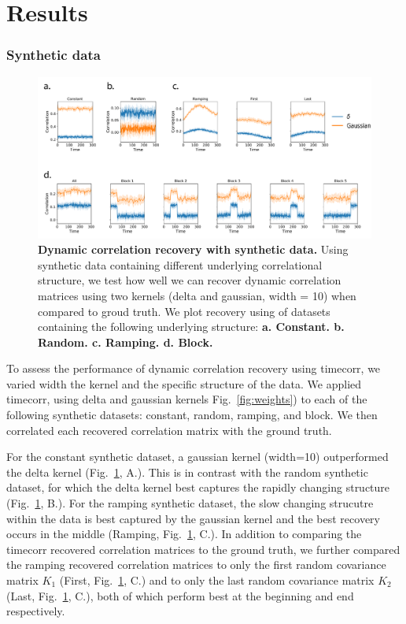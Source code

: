 \documentclass[english]{article}
\begin{document}
\section*{Results}
\subsubsection*{Synthetic data}


\begin{figure}
  \centering
  \includegraphics[width=\textwidth]{figs/synthetic_data.pdf}
  \caption{\textbf{Dynamic correlation recovery with synthetic data. } Using synthetic data containing different
    underlying correlational structure,
   we test how well we can recover dynamic correlation matrices using two kernels (delta and gaussian,
    width = 10) when compared to groud truth.  We plot recovery using of datasets containing the
    following underlying structure:
    \textbf{a. Constant. b. Random. c. Ramping.  d. Block.}}
  \label{fig:synthetic_data}
\end{figure}

To assess the performance of dynamic correlation recovery using
timecorr, we varied width the kernel and the specific structure of the
data. We applied timecorr, using delta and gaussian kernels
Fig.~\ref{fig:weights}) to each of the following  
synthetic datasets: constant, random, ramping, and block.  We then correlated each recovered
correlation matrix with the ground truth. 

For the constant synthetic dataset, a gaussian kernel (width=10)
outperformed the delta kernel (Fig.~\ref{fig:synthetic_data},  A.).  This is in contrast with the random
synthetic dataset, for which the delta kernel best captures the
rapidly changing structure (Fig.~\ref{fig:synthetic_data},  B.). For
the ramping synthetic dataset, the slow changing strucutre within the
data is best
captured by the gaussian kernel and the best recovery occurs in the
middle (Ramping, Fig.~\ref{fig:synthetic_data},
C.). In addition to comparing the timecorr recovered correlation
matrices to the ground truth, we
further compared the ramping recovered correlation matrices to only the first random covariance matrix $K_{1}$
(First, Fig.~\ref{fig:synthetic_data},  C.) and to only the last
random covariance matrix $K_{2}$ (Last, Fig.~\ref{fig:synthetic_data},
C.), both of which perform best at the beginning and end respectively.
\end{document}
